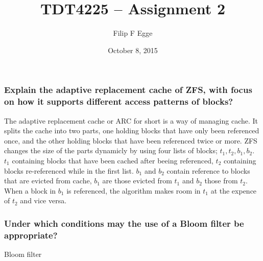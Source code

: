 \documentclass{article}
\begin{document}
\title{TDT4225 -- Assignment 2}
\author{Filip F Egge}
\date{October 8, 2015}
\maketitle

\newpage

\subsubsection{Explain the adaptive replacement cache of ZFS, with focus on how it supports different access
patterns of blocks?}
The adaptive replacement cache or ARC for short is a way of managing cache. It splits the cache into two parts, one holding blocks that
have only been referenced once, and the other holding blocks that have been referenced twice or more.
ZFS changes the size of the parts dynamicly by using four lists of blocks; $t_1, t_2, b_1, b_2$. $t_1$ containing blocks that have been
cached after beeing referenced, $t_2$ containing blocks re-referenced while in the first list. $b_1$ and $b_2$ contain reference 
to blocks that are evicted from cache, $b_1$ are those evicted from $t_1$ and $b_2$ those from $t_2$. When a block in $b_1$ is referenced, the algorithm makes room in $t_1$ at the expence of $t_2$ and vice versa.

\subsubsection{Under which conditions may the use of a Bloom filter be appropriate?}
Bloom filter
\end{document}
